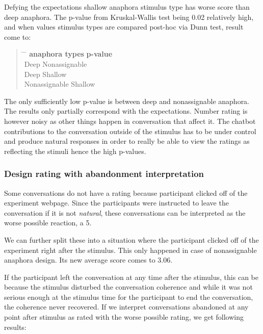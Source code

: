 Defying the expectations shallow anaphora stimulus type has worse score than deep anaphora.
The p-value from Kruskal-Wallis test being 0.02 relatively high, and
when values stimulus types are compared post-hoc via Dunn test,
result come to:

\begin{quote}
\begin{tabbing}
\hspace{4cm} \= \hspace{4cm} \= \kill %
\textbf{anaphora types} \> \> \textbf{p-value} \\
Deep \> Nonassignable  \\
Deep \> Shallow  \\
Nonassignable \> Shallow  \\
\end{tabbing}
\end{quote}

The only sufficiently low p-value is between deep and nonassignable anaphora.
The results only partially correspond with the expectations.
Number rating is however noisy as other things happen in conversation that affect it.
The chatbot contributions to the conversation outside of the stimulus
has to be under control and produce natural responses in order to really be able
to view the ratings as reflecting the stimuli
hence the high p-values.

\subsubsection{Design rating with abandonment interpretation}

Some conversations do not have a rating because participant clicked off of the experiment webpage.
Since the participants were instructed to leave the conversation if it is not \textit{natural},
these conversations can be interpreted as the worse possible reaction, a 5.

We can further split these into a situation where
the participant clicked off of the experiment
right after the stimulus.
This only happened in case of nonassignable anaphora design.
Its new average score comes to 3.06.

If the participant left the conversation at any time after the stimulus,
this can be because the stimulus disturbed the conversation coherence
and while it was not serious enough at the stimulus time for the participant
to end the conversation,
the coherence never recovered.
If we interpret conversations abandoned at any point after stimulus as rated with the worse possible rating,
we get following results:

